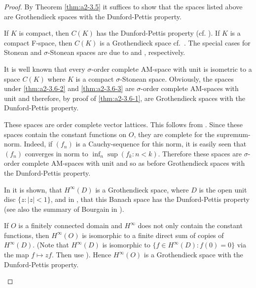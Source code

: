 \begin{proof}
By Theorem \ref{thm:a2-3.5}   it suffices to show that the spaces listed above are Grothendieck spaces with the Dunford-Pettis property.
\begin{description}[style=standard, wide, labelindent=.5em]
		
\item[\ref{thm:a2-3.6-1}] 
	If $K$ is compact, then $C(K)$ has the Dunford-Pettis property (cf. \citet[Théorème 4]{grothendieck:1953}).
	If $K$ is a compact F-space, then $C(K)$ is a Grothendieck space cf.~\citet[Theorem 2.5]{seever:1968}. 
	The special cases for Stonean and $\sigma$-Stonean spaces are due to \citet[Théorème 9]{grothendieck:1953} and \citet{ando:1961},  respectively.
		
\item[\ref{thm:a2-3.6-2} and \ref{thm:a2-3.6-3} ] It is well known that every $\sigma$-order complete AM-space with unit is isometric to a space $C(K)$ where $K$ is a compact $\sigma$-Stonean space.
Obviously, the spaces under \ref{thm:a2-3.6-2}   and \ref{thm:a2-3.6-3}  are $\sigma$-order complete AM-spaces with unit and therefore, by proof of \ref{thm:a2-3.6-1}, are  Grothendieck spaces with the Dunford-Pettis property.
		
\item[\ref{thm:a2-3.6-4} and \ref{thm:a2-3.6-5}] These spaces are order complete vector lattices.
This follows from \citet[pp.18-22, Standardbeispiele 1 and 2 p.55]{bauer:1966}.
Since these spaces contain the constant functions on $O$, they are complete for the supremum-norm.
Indeed, if $(f_n)$ is a Cauchy-sequence for this norm, it is easily seen that $(f_n)$ converges in norm to $\inf_n \sup(f_k \colon n < k)$.
Therefore these spaces are $\sigma$-order complete AM-spaces with unit and so as before Grothendieck spaces with the Dunford-Pettis property.
		
\item[\ref{thm:a2-3.6-6}] In \citet{bourgain:1982} it is shown, that $H^{\infty}(D)$ is a Grothendieck space, where $D$ is the open unit disc $\{z \colon |z| < 1\}$, and in \citet{bourgain:1984}, that this Banach space has the Dunford-Pettis property (see also the summary of Bourgain in \citet{blei:1983}).
		
If $O$ is a finitely connected domain and $H^{\infty}$ does not only contain the constant functions, then $H^{\infty}(O)$ is isomorphic to a finite direct sum of copies of $H^{\infty}(D)$.
(Note that $H^{\infty}(D)$ is isomorphic to $\{f \in H^{\infty}(D) \colon f(0) = 0\}$ via the map $f \mapsto zf$.
Then use \citet[p.77 and Proposition 4.4.1]{grothendieck:1953} ).
Hence $H^{\infty}(O)$ is a Grothendieck space with the Dunford-Pettis property.
		
\end{description}
	
\end{proof}
